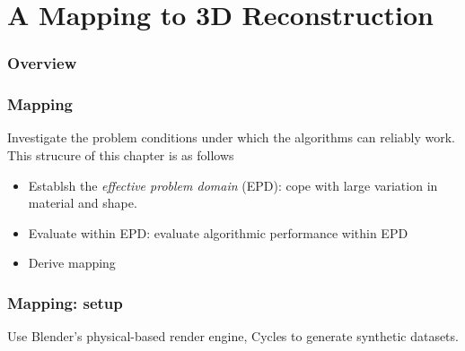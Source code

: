 \documentclass{beamer}
\begin{document}
\section{A Mapping to 3D Reconstruction} %

\begin{frame}
\frametitle{Overview} %
\tableofcontents[currentsection,currentsubsection, 
    hideothersubsections, 
    sectionstyle=show/shaded,] %
\end{frame}

\begin{frame}
\frametitle{Mapping}

Investigate the problem conditions under which the algorithms can reliably work. This strucure of this chapter is as follows

\begin{itemize}
\item Establsh the \textit{effective problem domain} (EPD): cope with large variation in material and shape.
\item Evaluate within EPD: evaluate algorithmic performance within EPD
\item Derive mapping
\end{itemize}

\end{frame}

\begin{frame}
\frametitle{Mapping: setup}

Use Blender's physical-based render engine, Cycles to generate synthetic datasets.

\end{frame}
\end{document}
